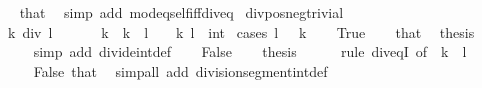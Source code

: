 \begin{isabellebody}
%
\isadelimproof
\ \ %
\endisadelimproof
%
\isatagproof
{}\isamarkupfalse%
\ that\ \isamarkupfalse%
\ {\isacharparenleft}{\kern0pt}simp\ add{\isacharcolon}{\kern0pt}\ mod{\isacharunderscore}{\kern0pt}eq{\isacharunderscore}{\kern0pt}self{\isacharunderscore}{\kern0pt}iff{\isacharunderscore}{\kern0pt}div{\isacharunderscore}{\kern0pt}eq{\isacharunderscore}{\kern0pt}{}{\isacharparenright}{\kern0pt}%
\endisatagproof
{\isafoldproof}%
%
\isadelimproof
\isanewline
%
\endisadelimproof
\isanewline
{}\isamarkupfalse%
\ div{\isacharunderscore}{\kern0pt}pos{\isacharunderscore}{\kern0pt}neg{\isacharunderscore}{\kern0pt}trivial{\isacharcolon}{\kern0pt}\isanewline
\ \ {\isachardoublequoteopen}k\ div\ l\ {\isacharequal}{\kern0pt}\ {\isacharminus}{\kern0pt}\ {}{\isachardoublequoteclose}\ \ {\isachardoublequoteopen}{}\ {\isacharless}{\kern0pt}\ k{\isachardoublequoteclose}\ \ {\isachardoublequoteopen}k\ {\isacharplus}{\kern0pt}\ l\ {\isasymle}\ {}{\isachardoublequoteclose}\ \ k\ l\ {\isacharcolon}{\kern0pt}{\isacharcolon}{\kern0pt}\ int\isanewline
%
\isadelimproof
%
\endisadelimproof
%
\isatagproof
{}\isamarkupfalse%
\ {\isacharparenleft}{\kern0pt}cases\ {\isacartoucheopen}l\ {\isacharequal}{\kern0pt}\ {\isacharminus}{\kern0pt}\ k{\isacartoucheclose}{\isacharparenright}{\kern0pt}\isanewline
\ \ \isamarkupfalse%
\ True\isanewline
\ \ \isamarkupfalse%
\ that\ \isamarkupfalse%
\ {\isacharquery}{\kern0pt}thesis\isanewline
\ \ \ \ \isamarkupfalse%
\ {\isacharparenleft}{\kern0pt}simp\ add{\isacharcolon}{\kern0pt}\ divide{\isacharunderscore}{\kern0pt}int{\isacharunderscore}{\kern0pt}def{\isacharparenright}{\kern0pt}\isanewline
{}\isamarkupfalse%
\isanewline
\ \ \isamarkupfalse%
\ False\isanewline
\ \ \isamarkupfalse%
\ {\isacharquery}{\kern0pt}thesis\isanewline
\ \ \ \ \isamarkupfalse%
\ {\isacharparenleft}{\kern0pt}rule\ div{\isacharunderscore}{\kern0pt}eqI\ {\isacharbrackleft}{\kern0pt}of\ {\isacharunderscore}{\kern0pt}\ {\isachardoublequoteopen}k\ {\isacharplus}{\kern0pt}\ l{\isachardoublequoteclose}{\isacharbrackright}{\kern0pt}{\isacharparenright}{\kern0pt}\isanewline
\ \ \ \ \isamarkupfalse%
\ False\ that\ \isamarkupfalse%
\ {\isacharparenleft}{\kern0pt}simp{\isacharunderscore}{\kern0pt}all\ add{\isacharcolon}{\kern0pt}\ division{\isacharunderscore}{\kern0pt}segment{\isacharunderscore}{\kern0pt}int{\isacharunderscore}{\kern0pt}def{\isacharparenright}{\kern0pt}\isanewline

\end{isabellebody}
